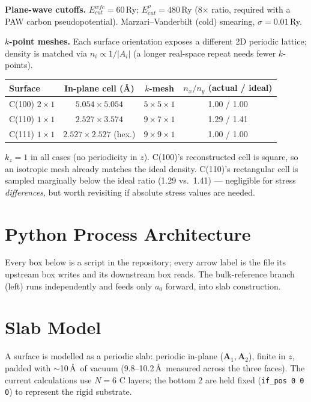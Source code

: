 \documentclass[11pt]{article}
\begin{document}
\textbf{Plane-wave cutoffs.} $E_{cut}^{wfc} = 60$\,Ry; $E_{cut}^{\rho} = 480$\,Ry (8$\times$ ratio, required with a PAW carbon pseudopotential). Marzari--Vanderbilt (cold) smearing, $\sigma = 0.01$\,Ry.

\textbf{$k$-point meshes.} Each surface orientation exposes a different 2D periodic lattice; density is matched via $n_i \propto 1/|A_i|$ (a longer real-space repeat needs fewer $k$-points).

\begin{center}
\begin{tabular}{lccc}
\toprule
Surface & In-plane cell (\AA) & $k$-mesh & $n_x/n_y$ (actual / ideal) \\
\midrule
C(100) $2\times1$ & $5.054 \times 5.054$ & $5\times5\times1$ & 1.00 / 1.00 \\
C(110) $1\times1$ & $2.527 \times 3.574$ & $9\times7\times1$ & 1.29 / 1.41 \\
C(111) $1\times1$ & $2.527\times2.527$ (hex.) & $9\times9\times1$ & 1.00 / 1.00 \\
\bottomrule
\end{tabular}
\end{center}

$k_z = 1$ in all cases (no periodicity in $z$). C(100)'s reconstructed cell is square, so an isotropic mesh already matches the ideal density. C(110)'s rectangular cell is sampled marginally below the ideal ratio (1.29 vs.\ 1.41) --- negligible for stress \textit{differences}, but worth revisiting if absolute stress values are needed.

\section*{Python Process Architecture}

Every box below is a script in the repository; every arrow label is the file its upstream box writes and its downstream box reads. The bulk-reference branch (left) runs independently and feeds only $a_0$ forward, into slab construction.

\section{Slab Model}

A surface is modelled as a periodic slab: periodic in-plane ($\mathbf{A}_1, \mathbf{A}_2$), finite in $z$, padded with $\sim$10\,\AA\ of vacuum (9.8--10.2\,\AA\ measured across the three faces). The current calculations use $N = 6$ C layers; the bottom 2 are held fixed (\texttt{if\_pos 0 0 0}) to represent the rigid substrate.
\end{document}
